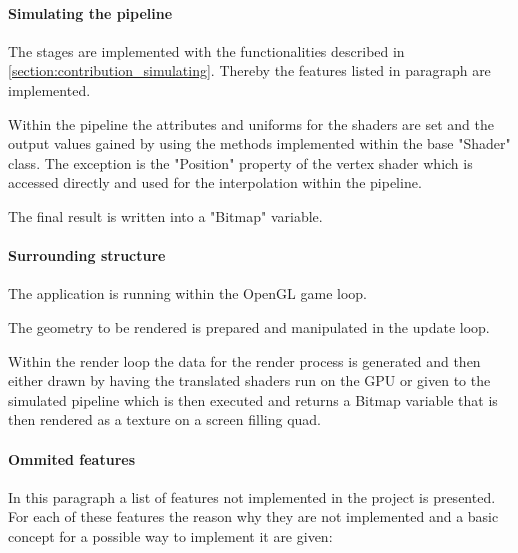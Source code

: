 \paragraph{Simulating the pipeline}

The stages are implemented with the functionalities described in \autoref{section:contribution_simulating}. Thereby the features listed in paragraph  are implemented.

Within the pipeline the attributes and uniforms for the shaders are set and the output values gained by using the methods implemented within the base "Shader" class. The exception is the "Position" property of the vertex shader which is accessed directly and used for the interpolation within the pipeline.

The final result is written into a "Bitmap" variable.

\paragraph{Surrounding structure}

The application is running within the OpenGL game loop.

The geometry to be rendered is prepared and manipulated in the update loop.

Within the render loop the data for the render process is generated and then either drawn by having the translated shaders run on the GPU or given to the simulated pipeline which is then executed and returns a Bitmap variable that is then rendered as a texture on a screen filling quad.

\paragraph{Ommited features}

In this paragraph a list of features not implemented in the project is presented. For each of these features the reason why they are not implemented and a basic concept for a possible way to implement it are given:


